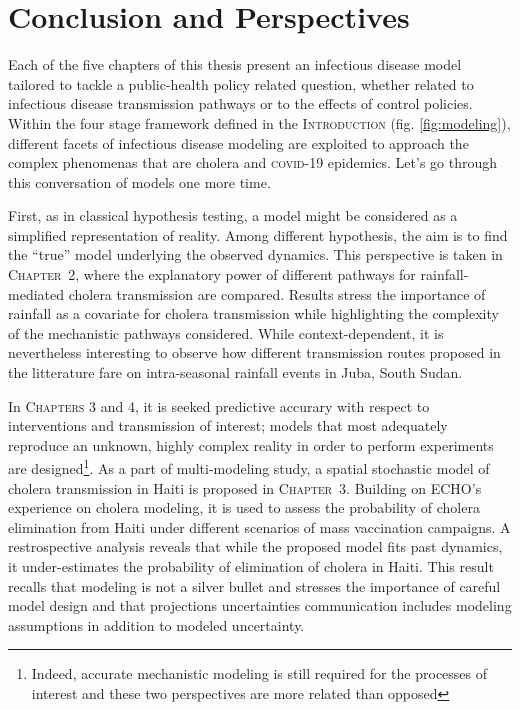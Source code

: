 \chapter*{Conclusion and Perspectives}
Each of the five chapters of this thesis present an infectious disease model tailored to tackle a public-health policy related question, whether related to infectious disease transmission pathways or to the effects of control policies. Within the four stage framework defined in the \textsc{Introduction} (fig. \ref{fig:modeling}), different facets of infectious disease modeling are exploited to approach the complex phenomenas that are cholera and \textsc{covid}-19 epidemics. Let's go through this conversation of models one more time.

First, as in classical hypothesis testing, a model might be considered as a simplified representation of reality. Among different hypothesis, the aim is to find the ``true'' model underlying the observed dynamics. This perspective is taken in \textsc{Chapter~2}, where the explanatory power of different pathways for rainfall-mediated cholera transmission are compared. Results stress the importance of rainfall as a covariate for cholera transmission while highlighting the complexity of the mechanistic pathways considered. While context-dependent, it is nevertheless interesting to observe how different transmission routes proposed in the litterature fare on intra-seasonal rainfall events in Juba, South Sudan.

In \textsc{Chapters 3} and 4, it is seeked predictive accurary with respect to interventions and transmission of interest; models that most adequately reproduce an unknown, highly complex reality in order to perform experiments are designed\footnote{Indeed, accurate mechanistic modeling is still required for the processes of interest and these two perspectives are more related than opposed}. As a part of multi-modeling study, a spatial stochastic model of cholera transmission in Haiti is proposed in \textsc{Chapter~3}. Building on ECHO's experience on cholera modeling, it is used to assess the probability of cholera elimination from Haiti under different scenarios of mass vaccination campaigns. A restrospective analysis reveals that while the proposed model fits past dynamics, it under-estimates the probability of elimination of cholera in Haiti. This result recalls that modeling is not a silver bullet and stresses the importance of careful model design and that projections uncertainties communication includes modeling assumptions in addition to modeled uncertainty.

